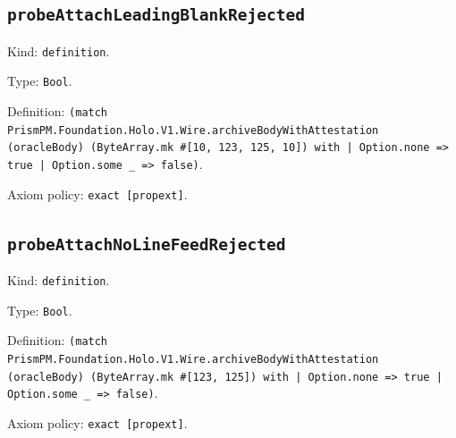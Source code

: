 \documentclass[11pt]{article}
\begin{document}
\subsection*{\texttt{probeAttachLeadingBlankRejected}}
\noindent Kind: \texttt{definition}.\par
\noindent Type: \texttt{Bool}.\par
\noindent Definition: \texttt{(match PrismPM.Foundation.Holo.V1.Wire.archiveBodyWithAttestation (oracleBody) (ByteArray.mk \#[10, 123, 125, 10]) with | Option.none => true | Option.some \_ => false)}.\par
\noindent Axiom policy: \texttt{exact [propext]}.\par
\subsection*{\texttt{probeAttachNoLineFeedRejected}}
\noindent Kind: \texttt{definition}.\par
\noindent Type: \texttt{Bool}.\par
\noindent Definition: \texttt{(match PrismPM.Foundation.Holo.V1.Wire.archiveBodyWithAttestation (oracleBody) (ByteArray.mk \#[123, 125]) with | Option.none => true | Option.some \_ => false)}.\par
\noindent Axiom policy: \texttt{exact [propext]}.\par
\end{document}
